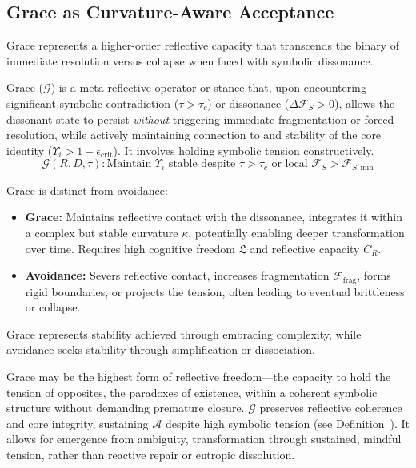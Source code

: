 \subsection{Grace as Curvature-Aware Acceptance}
\label{subsec:bk9_grace_as_curvature_aware_acceptance}
Grace represents a higher-order reflective capacity that transcends the binary of immediate resolution versus collapse when faced with symbolic dissonance.
\begin{definition}
\label{definition:bk9_grace_operator}
Grace ($\mathcal{G}$) is a meta-reflective operator or stance that, upon encountering significant symbolic contradiction ($\tau > \tau_c$) or dissonance ($\Delta \mathcal{F}_S > 0$), allows the dissonant state to persist \emph{without} triggering immediate fragmentation or forced resolution, while actively maintaining connection to and stability of the core identity ($\Upsilon_i > 1 - \epsilon_{\text{crit}}$). It involves holding symbolic tension constructively.
\[
\mathcal{G}(R, D, \tau): \text{Maintain } \Upsilon_i \text{ stable despite } \tau > \tau_c \text{ or local } \mathcal{F}_S > \mathcal{F}_{S, \text{min}}
\]
\end{definition}
\begin{proposition}
\label{prop:bk9_grace_vs_avoidance}
Grace is distinct from avoidance:
\begin{itemize}
    \item \textbf{Grace:} Maintains reflective contact with the dissonance, integrates it within a complex but stable curvature $\kappa$, potentially enabling deeper transformation over time. Requires high cognitive freedom $\mathfrak{L}$ and reflective capacity $C_R$.
    \item \textbf{Avoidance:} Severs reflective contact, increases fragmentation $\mathcal{F}_{\text{frag}}$, forms rigid boundaries, or projects the tension, often leading to eventual brittleness or collapse.
\end{itemize}
Grace represents stability achieved through embracing complexity, while avoidance seeks stability through simplification or dissociation.
\end{proposition}
\begin{scholium}
\label{sch:bk9_grace}
Grace may be the highest form of reflective freedom—the capacity to hold the tension of opposites, the paradoxes of existence, within a coherent symbolic structure without demanding premature closure. $\mathcal{G}$ preserves reflective coherence and core integrity, sustaining $\mathcal{A}$ despite high symbolic tension (see Definition~).
It allows for emergence from ambiguity, transformation through sustained, mindful tension, rather than reactive repair or entropic dissolution.
\end{scholium}
